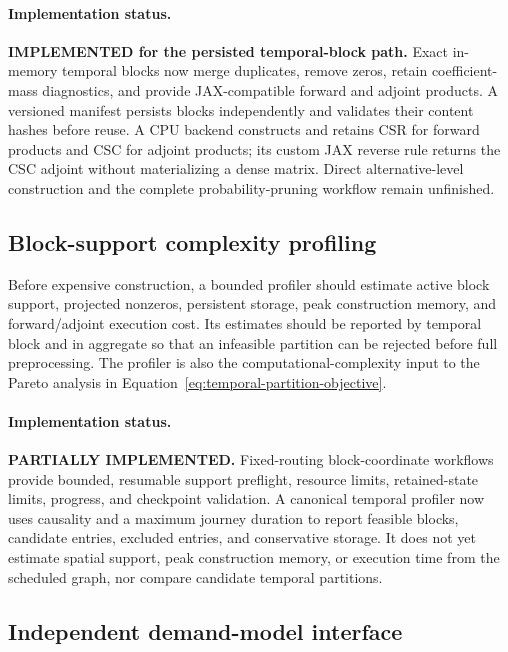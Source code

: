 \paragraph{Implementation status.}
\textbf{IMPLEMENTED for the persisted temporal-block path.}  Exact in-memory temporal blocks now merge duplicates,
remove zeros, retain coefficient-mass diagnostics, and provide JAX-compatible
forward and adjoint products.  A versioned manifest persists blocks
independently and validates their content hashes before reuse.  A CPU backend
constructs and retains CSR for forward products and CSC for adjoint products;
its custom JAX reverse rule returns the CSC adjoint without materializing a
dense matrix.  Direct alternative-level construction and the complete
probability-pruning workflow remain unfinished.

\subsection{Block-support complexity profiling}

Before expensive construction, a bounded profiler should estimate active block
support, projected nonzeros, persistent storage, peak construction memory, and
forward/adjoint execution cost.  Its estimates should be reported by temporal
block and in aggregate so that an infeasible partition can be rejected before
full preprocessing.  The profiler is also the computational-complexity input
to the Pareto analysis in
Equation~\eqref{eq:temporal-partition-objective}.

\paragraph{Implementation status.}
\textbf{PARTIALLY IMPLEMENTED.}  Fixed-routing block-coordinate workflows
provide bounded, resumable support preflight, resource limits, retained-state
limits, progress, and checkpoint validation.  A canonical temporal profiler now
uses causality and a maximum journey duration to report feasible blocks,
candidate entries, excluded entries, and conservative storage.  It does not
yet estimate spatial support, peak construction memory, or execution time from
the scheduled graph, nor compare candidate temporal partitions.

\subsection{Independent demand-model interface}

